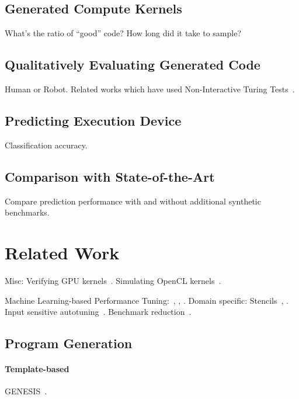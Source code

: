 \documentclass[preprint,nonatbib,10pt,nocopyrightspace]{sigplanconf}
\begin{document}
\subsection{Generated Compute Kernels}\label{subsec:}

What's the ratio of ``good'' code? How long did it take to sample?


\subsection{Qualitatively Evaluating Generated Code}\label{subsec:}

Human or Robot. Related works which have used Non-Interactive Turing
Tests~\cite{Gao2015a,Zhang2016}.


\subsection{Predicting Execution Device}\label{subsec:}

Classification accuracy.


\subsection{Comparison with State-of-the-Art}\label{subsec:}

Compare prediction performance with and without additional synthetic
benchmarks.


\section{Related Work}\label{sec:related-work}

Misc: Verifying GPU kernels~\cite{Betts2012}. Simulating OpenCL
kernels~\cite{Price2015}.

Machine Learning-based Performance Tuning:~\cite{Wen2015},
\cite{Magni2014}, \cite{Falch2015}. Domain specific:
Stencils~\cite{Garvey2015b}, \cite{Cummins2015a}. Input sensitive
autotuning~\cite{Ding2015}. Benchmark reduction~\cite{Castro2014}.


\subsection{Program Generation}


\paragraph{Template-based} GENESIS~\cite{Chiu2015}.
\end{document}
